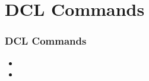 \section{ DCL Commands}
\begin{frame}

	\frametitle{  DCL Commands}
	
	\begin{itemize}
	
	    \item
	
	    \item
	
	\end{itemize}
	
\end{frame}